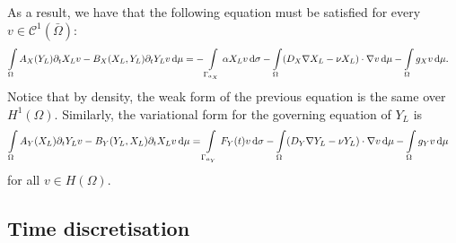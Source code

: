 \documentclass[a4paper,doc,11pt]{article}
\begin{document}
As a result, we have that the following equation must be satisfied for every $v \in \mathcal{C}^1 (\bar\Omega)$:
\begin{align}
    \int\limits_\Omega
    A_X(Y_L) \partial_t X_L v - B_X(X_L,Y_L) \partial_t Y_L v \dif \mu
    &=
    -\int\limits_{\Gamma_{a_X}}    \alpha X_L v    \dif \sigma
    -\int\limits_\Omega        (D_X \nabla X_L - \nu X_L) \cdot \nabla v  \dif \mu
    -\int\limits_\Omega        g_X v \dif \mu.
\end{align}
Notice that by density, the weak form of the previous equation is the same over $H^1(\Omega)$.
Similarly, the variational form for the governing equation of $Y_L$ is
\begin{align}
    \int\limits_\Omega
    A_Y(X_L) \partial_t Y_L v - B_Y(Y_L,X_L) \partial_t X_L v \dif \mu
    &=
    \int\limits_{\Gamma_{a_Y}}     F_Y(t) v    \dif \sigma
    -\int\limits_\Omega        (D_Y \nabla Y_L - \nu Y_L) \cdot \nabla v  \dif \mu
    -\int\limits_\Omega        g_Y v \dif \mu 
\end{align}
for all \(v \in H(\Omega)\).



\subsection{Time discretisation}
\end{document}
